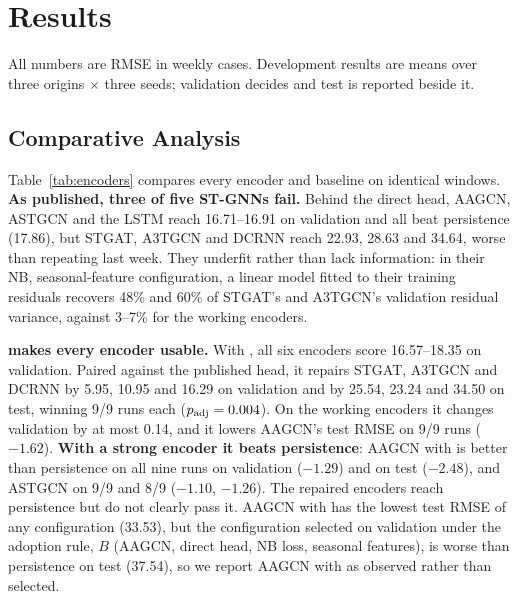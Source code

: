 %
\section{Results}
\label{sec:results}

All numbers are RMSE in weekly cases. Development results are means over three
origins $\times$ three seeds; validation decides and test is reported beside it.

\subsection{Comparative Analysis}
\label{sec:comparative}
Table~\ref{tab:encoders} compares every encoder and baseline on identical windows.
\textbf{As published, three of five ST-GNNs fail.} Behind the direct head, AAGCN,
ASTGCN and the LSTM reach 16.71--16.91 on validation and all beat persistence (17.86),
but STGAT, A3TGCN and DCRNN reach 22.93, 28.63 and 34.64, worse than repeating last
week. They underfit rather than lack information: in their NB, seasonal-feature configuration, a
linear model fitted to their training residuals recovers 48\% and 60\% of STGAT's and
A3TGCN's validation residual variance, against 3--7\% for the working encoders.

\textbf{\model{} makes every encoder usable.} With \model{}, all six encoders score
16.57--18.35 on validation. Paired against the published head, it repairs STGAT,
A3TGCN and DCRNN by 5.95, 10.95 and 16.29 on validation and by 25.54, 23.24 and 34.50
on test, winning 9/9 runs each ($p_{\text{adj}}=0.004$). On the working encoders it changes
validation by at most 0.14, and it lowers AAGCN's test RMSE on 9/9 runs ($-1.62$).
\textbf{With a strong encoder it beats persistence}: AAGCN with \model{} is better than
persistence on all nine runs on validation ($-1.29$) and on test ($-2.48$), and ASTGCN
on 9/9 and 8/9 ($-1.10$, $-1.26$). The repaired encoders reach persistence but do not
clearly pass it. AAGCN with \model{} has the lowest test RMSE of any configuration
(33.53), but the configuration selected on validation under the adoption rule, $B$
(AAGCN, direct head, NB loss, seasonal features), is
worse than persistence on test (37.54), so we report AAGCN with \model{} as
observed rather than selected. %

